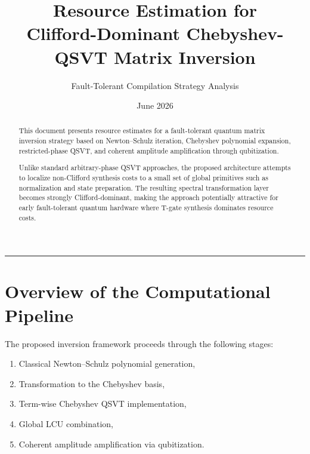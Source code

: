 \documentclass[12pt,a4paper]{article}
\begin{document}
\title{
\textbf{
Resource Estimation for\\
Clifford-Dominant Chebyshev-QSVT Matrix Inversion
}
}

\author{
Fault-Tolerant Compilation Strategy Analysis
}

\date{June 2026}

\maketitle

\begin{abstract}
This document presents resource estimates for a fault-tolerant quantum matrix inversion strategy based on Newton--Schulz iteration, Chebyshev polynomial expansion, restricted-phase QSVT, and coherent amplitude amplification through qubitization. 

Unlike standard arbitrary-phase QSVT approaches, the proposed architecture attempts to localize non-Clifford synthesis costs to a small set of global primitives such as normalization and state preparation. The resulting spectral transformation layer becomes strongly Clifford-dominant, making the approach potentially attractive for early fault-tolerant quantum hardware where T-gate synthesis dominates resource costs.
\end{abstract}

\tableofcontents

\vspace{1em}
\hrule
\vspace{1em}


\section{Overview of the Computational Pipeline}

The proposed inversion framework proceeds through the following stages:

\begin{enumerate}
    \item Classical Newton--Schulz polynomial generation,
    \item Transformation to the Chebyshev basis,
    \item Term-wise Chebyshev QSVT implementation,
    \item Global LCU combination,
    \item Coherent amplitude amplification via qubitization.
\end{enumerate}
\end{document}
